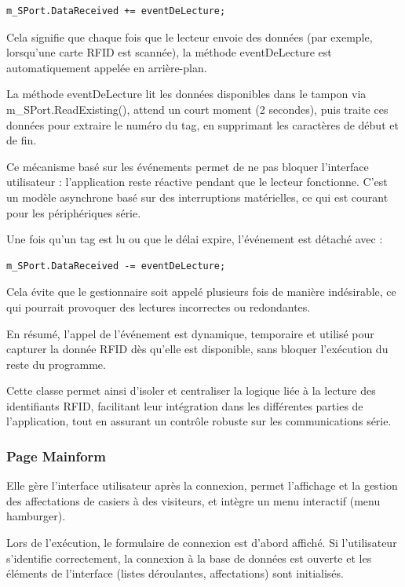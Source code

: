 \documentclass[main.tex]{subfiles}
\begin{document}
\begin{lstlisting}
m_SPort.DataReceived += eventDeLecture; 
\end{lstlisting}

Cela signifie que chaque fois que le lecteur envoie des données (par exemple, lorsqu'une carte RFID est scannée), la méthode eventDeLecture est automatiquement appelée en arrière-plan. 

La méthode eventDeLecture lit les données disponibles dans le tampon via m\_SPort.ReadExisting(), attend un court moment (2 secondes), puis traite ces données pour extraire le numéro du tag, en supprimant les caractères de début et de fin. 

Ce mécanisme basé sur les événements permet de ne pas bloquer l'interface utilisateur : l’application reste réactive pendant que le lecteur fonctionne. C’est un modèle asynchrone basé sur des interruptions matérielles, ce qui est courant pour les périphériques série. 

Une fois qu’un tag est lu ou que le délai expire, l’événement est détaché avec : 

\begin{lstlisting}
m_SPort.DataReceived -= eventDeLecture; 
\end{lstlisting}

Cela évite que le gestionnaire soit appelé plusieurs fois de manière indésirable, ce qui pourrait provoquer des lectures incorrectes ou redondantes. 

En résumé, l’appel de l’événement est dynamique, temporaire et utilisé pour capturer la donnée RFID dès qu’elle est disponible, sans bloquer l’exécution du reste du programme. 

Cette classe permet ainsi d’isoler et centraliser la logique liée à la lecture des identifiants RFID, facilitant leur intégration dans les différentes parties de l’application, tout en assurant un contrôle robuste sur les communications série. 

\subsubsection{Page Mainform}

Elle gère l'interface utilisateur après la connexion, permet l'affichage et la gestion des affectations de casiers à des visiteurs, et intègre un menu interactif (menu hamburger). 

Lors de l’exécution, le formulaire de connexion est d’abord affiché. Si l’utilisateur s’identifie correctement, la connexion à la base de données est ouverte et les éléments de l’interface (listes déroulantes, affectations) sont initialisés. 
\end{document}
